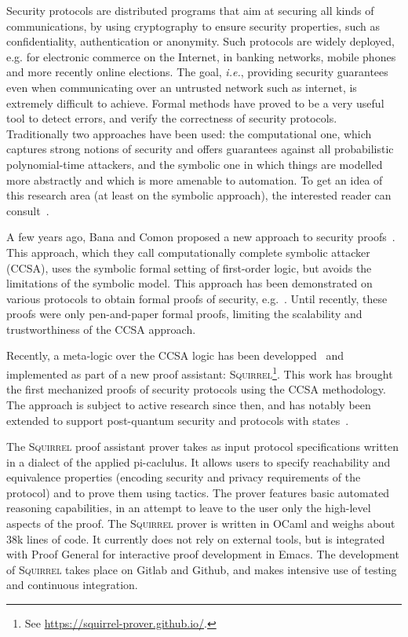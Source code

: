 \documentclass[10pt,a4paper]{article}
\newcommand{\ie}{\textit{i.e.}\xspace}
\newcommand{\Squirrel}{\textsc{Squirrel}\xspace}
\begin{document}
Security protocols are distributed programs that aim at securing all
kinds of communications, by using cryptography to ensure security
properties, such as confidentiality, authentication or anonymity. Such
protocols are widely deployed, e.g. for electronic commerce on the
Internet, in banking networks, mobile phones and more recently online
elections. The goal, \ie, providing security guarantees even when
communicating over an untrusted network such as internet,
is extremely difficult to achieve.
Formal methods have proved to be a very useful tool to detect errors,
and verify the correctness of security protocols. Traditionally two
approaches have been used: the computational one, which captures
strong notions of security and offers guarantees against all
probabilistic polynomial-time attackers, and the symbolic one in which
things are modelled more 
abstractly and which is more amenable to automation. To get an idea of
this research area (at least on the symbolic approach), the interested reader can consult~\cite{FormalSecurityIOSPress}.

A few years ago, Bana and Comon proposed a new approach to security
proofs~\cite{Bana:2014:CCS}. 
This approach, which they call computationally complete symbolic
attacker (CCSA), uses the symbolic formal setting of first-order
logic, but avoids the limitations of the symbolic model. This approach
has been demonstrated on various protocols to obtain formal proofs of
security, e.g.~\cite{ComonK17}. Until recently, these proofs were only
pen-and-paper 
formal proofs, limiting the scalability and trustworthiness of the CCSA approach.

Recently, a meta-logic over the CCSA logic has been developped~\cite{BDJKS-sp21}
and implemented as part of a new proof assistant: \Squirrel\footnote{
  See \url{https://squirrel-prover.github.io/}.}.
This work has brought the first mechanized proofs of security protocols using 
the CCSA methodology. The approach is subject to active research since
then, and has notably been extended to support post-quantum security
\cite{PQBC} and protocols with states~\cite{CSF22}.

The \Squirrel proof assistant prover takes as input protocol specifications 
written
in a dialect of the applied pi-caclulus. It allows users to specify
reachability and equivalence properties (encoding security and privacy
requirements of the protocol) and to prove them using tactics. The
prover features basic automated reasoning capabilities, in an attempt
to leave to the user only the high-level aspects of the proof. The
\Squirrel prover is written in OCaml and weighs about 38k lines of
code. It currently does not rely on external tools, but is integrated
with Proof General for interactive proof development in Emacs. The
development of \Squirrel takes place on %
Gitlab and Github, and makes intensive use of testing and continuous integration.
\end{document}
